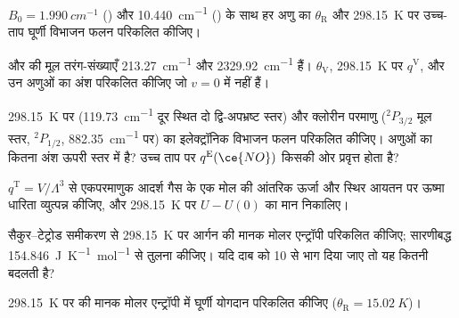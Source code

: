 \begin{exercise}[$\star$]\label{exo:b3:partition-functions:4}
$B_0 = \qty{1.990}{cm^{-1}}$ () और \qty{10.440}{cm^{-1}} () के साथ हर अणु का $\theta_{\mathrm R}$ और
\qty{298.15}{K} पर उच्च-ताप घूर्णी विभाजन फलन
परिकलित कीजिए।
\end{exercise}

\begin{exercise}[$\star\star$]\label{exo:b3:partition-functions:5}
 और  की मूल तरंग-संख्याएँ \qty{213.27}{cm^{-1}} और
\qty{2329.92}{cm^{-1}} हैं। $\theta_{\mathrm V}$, \qty{298.15}{K} पर $q^{\mathrm V}$, और उन अणुओं का अंश परिकलित कीजिए
जो $v = 0$ में नहीं हैं।
\end{exercise}

\begin{exercise}[$\star\star$]\label{exo:b3:partition-functions:6}
\qty{298.15}{K} पर  (\qty{119.73}{cm^{-1}} दूर स्थित दो द्वि-अपभ्रष्ट
स्तर) और क्लोरीन परमाणु (${}^2P_{3/2}$
मूल स्तर, ${}^2P_{1/2}$, \qty{882.35}{cm^{-1}} पर) का इलेक्ट्रॉनिक विभाजन फलन परिकलित कीजिए।  अणुओं का कितना अंश
ऊपरी स्तर में है? उच्च ताप पर $q^{\mathrm E}(\ce{NO})$ किसकी ओर प्रवृत्त होता है?
\end{exercise}

\begin{exercise}[$\star\star$]\label{exo:b3:partition-functions:7}
$q^{\mathrm T} = V/\Lambda^3$ से एकपरमाणुक आदर्श गैस के एक मोल की आंतरिक ऊर्जा और
स्थिर आयतन पर ऊष्मा धारिता व्युत्पन्न कीजिए, और \qty{298.15}{K} पर $U - U(0)$ का मान
निकालिए।
\end{exercise}

\begin{exercise}[$\star\star$]\label{exo:b3:partition-functions:8}
सैकुर--टेट्रोड समीकरण से \qty{298.15}{K} पर आर्गन की मानक मोलर एन्ट्रॉपी
परिकलित कीजिए; सारणीबद्ध
\qty{154.846}{J.K^{-1}.mol^{-1}} से तुलना कीजिए। यदि दाब को 10 से भाग दिया जाए तो यह कितनी बदलती है?
\end{exercise}

\begin{exercise}[$\star\star$]\label{exo:b3:partition-functions:9}
\qty{298.15}{K} पर  की मानक मोलर एन्ट्रॉपी में घूर्णी योगदान
परिकलित कीजिए ($\theta_{\mathrm R} = \qty{15.02}{K}$)।
\end{exercise}

